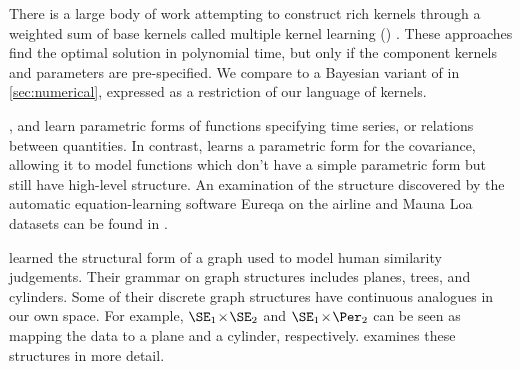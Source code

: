 There is a large body of work attempting to construct rich kernels through a weighted sum of base kernels called multiple kernel learning (\MKL{}) \citep[e.g.][]{bach2004multiple}.
These approaches find the optimal solution in polynomial time, but only if the component kernels and parameters are pre-specified.
We compare to a Bayesian variant of \MKL{} in \cref{sec:numerical}, expressed as a restriction of our language of kernels.


\cite{todorovski1997declarative}, \cite{washio1999discovering} and \cite{Schmidt2009b} learn parametric forms of functions specifying time series, or relations between quantities.
In contrast, \procedurename{} learns a parametric form for the covariance, allowing it to model functions which don't have a simple parametric form but still have high-level structure.
An examination of the structure discovered by the automatic equation-learning software Eureqa \citep{Eureqa} on the airline and Mauna Loa datasets can be found in \citet{LloDuvGroetal14}.





\citet{kemp2008discovery} learned the structural form of a graph used to model human similarity judgements.
Their grammar on graph structures includes planes, trees, and cylinders.
Some of their discrete graph structures have continuous analogues in our own space.
For example, $\SE_1 \kerntimes \SE_2$ and $\SE_1 \kerntimes \Per_2$ can be seen as mapping the data to a plane and a cylinder, respectively.
 examines these structures in more detail.

